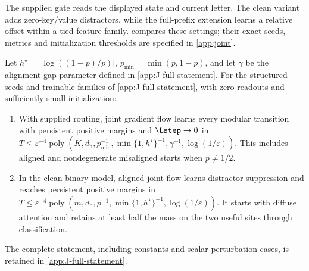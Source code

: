 The supplied gate reads the displayed state and current letter. The clean variant adds
zero-key/value distractors, while the full-prefix extension learns a relative offset within a
tied feature family.  compares these settings; their exact seeds,
metrics and initialization thresholds are specified in \cref{app:joint}.

\begin{table}[t]
\centering\small
{}
\caption{Three complementary step-learning settings. Full-prefix routing uses a planted tied feature and unequal fixed mobilities; it does not subsume the other guarantees.}
\label{tab:step-settings}
\end{table}

\begin{theorem}
\label{thm:joint}
Let $h^\star=|\log((1-p)/p)|$, $p_{\min}=\min(p,1-p)$, and let $\gamma$
be the alignment-gap parameter defined in \cref{app:J-full-statement}.
For the structured seeds and trainable families of \cref{app:J-full-statement},
with zero readouts and sufficiently small initialization:
\begin{enumerate}[label=(\roman*),leftmargin=*,itemsep=0pt,topsep=2pt]
\item With supplied routing, joint gradient flow learns every modular transition
with persistent positive margins and $\Lstep\to0$ in
$T\le\varepsilon^{-4}\operatorname{poly}(K,d_{\mathrm h},p_{\min}^{-1},
\min\{1,h^\star\}^{-1},\gamma^{-1},\log(1/\varepsilon))$.
This includes aligned and nondegenerate misaligned starts when $p\ne1/2$.
\item In the clean binary model, aligned joint flow learns distractor suppression
and reaches persistent positive margins in
$T\le\varepsilon^{-4}\operatorname{poly}(m,d_{\mathrm h},p^{-1},
\min\{1,h^\star\}^{-1},\log(1/\varepsilon))$.
It starts with diffuse attention and retains at least half the mass on the two
useful sites through classification.
\end{enumerate}
The complete statement, including constants and scalar-perturbation cases,
is retained in \cref{app:J-full-statement}.
\end{theorem}

